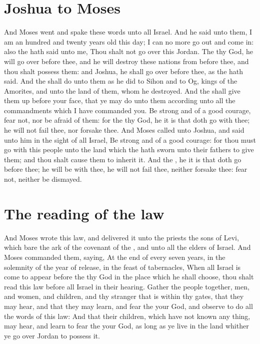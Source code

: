\section*{Joshua to Moses}
\begin{biblechapter} %
\verse And Moses went and spake these words unto all Israel.
\verse And he said unto them, I am an hundred and twenty years old this day; I can no more go out and come in: also the \LORD hath said unto me, Thou shalt not go over this Jordan.
\verse The \LORD thy God, he will go over before thee, and he will destroy these nations from before thee, and thou shalt possess them: and Joshua, he shall go over before thee, as the \LORD hath said.
\verse And the \LORD shall do unto them as he did to Sihon and to Og, kings of the Amorites, and unto the land of them, whom he destroyed.
\verse And the \LORD shall give them up before your face, that ye may do unto them according unto all the commandments which I have commanded you.
\verse Be strong and of a good courage, fear not, nor be afraid of them: for the \LORD thy God, he it is that doth go with thee; he will not fail thee, nor forsake thee.
\verse And Moses called unto Joshua, and said unto him in the sight of all Israel, Be strong and of a good courage: for thou must go with this people unto the land which the \LORD hath sworn unto their fathers to give them; and thou shalt cause them to inherit it.
\verse And the \LORD, he it is that doth go before thee; he will be with thee, he will not fail thee, neither forsake thee: fear not, neither be dismayed.
\section*{The reading of the law}
\verse And Moses wrote this law, and delivered it unto the priests the sons of Levi, which bare the ark of the covenant of the \LORD, and unto all the elders of Israel.
\verse And Moses commanded them, saying, At the end of every seven years, in the solemnity of the year of release, in the feast of tabernacles,
\verse When all Israel is come to appear before the \LORD thy God in the place which he shall choose, thou shalt read this law before all Israel in their hearing.
\verse Gather the people together, men, and women, and children, and thy stranger that is within thy gates, that they may hear, and that they may learn, and fear the \LORD your God, and observe to do all the words of this law:
\verse And that their children, which have not known any thing, may hear, and learn to fear the \LORD your God, as long as ye live in the land whither ye go over Jordan to possess it.

\end{biblechapter}
